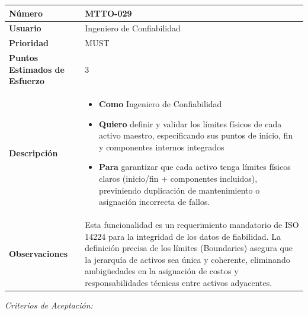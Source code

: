 \begin{longtable}{|p{0.21\textwidth}|p{0.74\textwidth}|}\hline
\textbf{Número} & MTTO-029 \\ \hline
\textbf{Usuario} & Ingeniero de Confiabilidad \\ \hline
\textbf{Prioridad} & MUST \\ \hline
\textbf{Puntos Estimados de Esfuerzo} & 3 \\ \hline
\textbf{Descripción} & \parbox[t]{\linewidth}{\vspace{2pt}\begin{itemize}[leftmargin=1.5em, nosep, topsep=0pt]
\item \textbf{Como} Ingeniero de Confiabilidad
\item \textbf{Quiero} definir y validar los límites físicos de cada activo maestro, especificando sus puntos de inicio, fin y componentes internos integrados
\item \textbf{Para} garantizar que cada activo tenga límites físicos claros (inicio/fin + componentes incluidos), previniendo duplicación de mantenimiento o asignación incorrecta de fallos.
\end{itemize}\vspace{2pt}} \\ \hline
\textbf{Observaciones} & Esta funcionalidad es un requerimiento mandatorio de ISO 14224 para la integridad de los datos de fiabilidad. La definición precisa de los límites (Boundaries) asegura que la jerarquía de activos sea única y coherente, eliminando ambigüedades en la asignación de costos y responsabilidades técnicas entre activos adyacentes. \\ \hline
\end{longtable}\normalsize
\noindent\textit{Criterios de Aceptación:}
